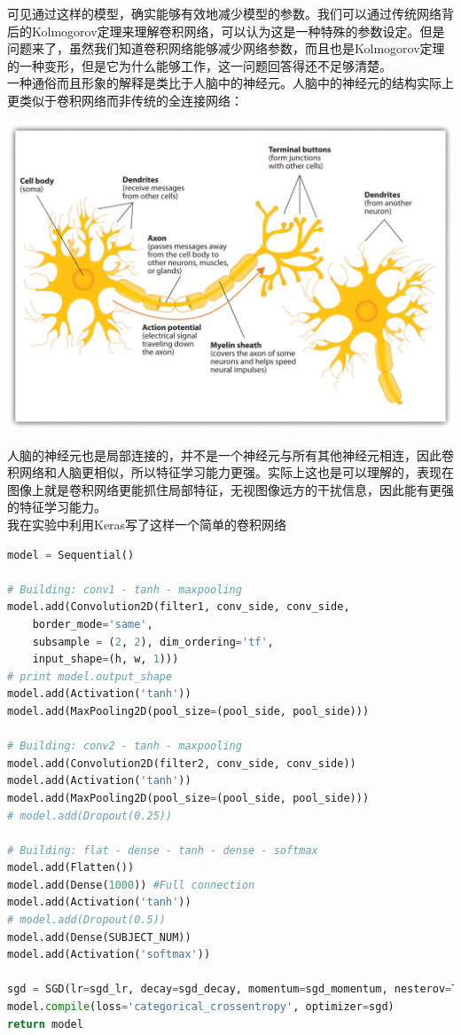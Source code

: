\documentclass[12pt]{article}
\begin{document}
可见通过这样的模型，确实能够有效地减少模型的参数。我们可以通过传统网络背后的Kolmogorov定理来理解卷积网络，可以认为这是一种特殊的参数设定。但是问题来了，虽然我们知道卷积网络能够减少网络参数，而且也是Kolmogorov定理的一种变形，但是它为什么能够工作，这一问题回答得还不足够清楚。\\

一种通俗而且形象的解释是类比于人脑中的神经元。人脑中的神经元的结构实际上更类似于卷积网络而非传统的全连接网络：

\begin{center}
\includegraphics[width=0.8\linewidth]{fig12.jpg}
\end{center}

人脑的神经元也是局部连接的，并不是一个神经元与所有其他神经元相连，因此卷积网络和人脑更相似，所以特征学习能力更强。实际上这也是可以理解的，表现在图像上就是卷积网络更能抓住局部特征，无视图像远方的干扰信息，因此能有更强的特征学习能力。\\

我在实验中利用Keras写了这样一个简单的卷积网络\\

 \begin{lstlisting}[caption={Keras CNN}, language=python]
model = Sequential()

# Building: conv1 - tanh - maxpooling
model.add(Convolution2D(filter1, conv_side, conv_side,
    border_mode='same', 
    subsample = (2, 2), dim_ordering='tf', 
    input_shape=(h, w, 1)))
# print model.output_shape
model.add(Activation('tanh'))
model.add(MaxPooling2D(pool_size=(pool_side, pool_side)))

# Building: conv2 - tanh - maxpooling
model.add(Convolution2D(filter2, conv_side, conv_side))  
model.add(Activation('tanh'))  
model.add(MaxPooling2D(pool_size=(pool_side, pool_side)))  
# model.add(Dropout(0.25))  

# Building: flat - dense - tanh - dense - softmax
model.add(Flatten())  
model.add(Dense(1000)) #Full connection  
model.add(Activation('tanh'))  
# model.add(Dropout(0.5))  
model.add(Dense(SUBJECT_NUM))  
model.add(Activation('softmax')) 

sgd = SGD(lr=sgd_lr, decay=sgd_decay, momentum=sgd_momentum, nesterov=True)
model.compile(loss='categorical_crossentropy', optimizer=sgd)
return model
\end{lstlisting}
\end{document}
